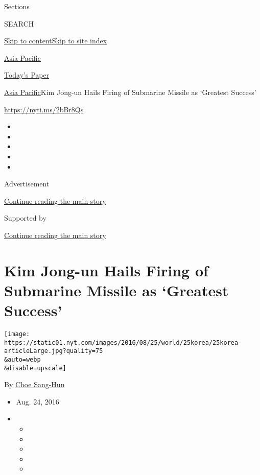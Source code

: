 Sections

SEARCH

\protect\hyperlink{site-content}{Skip to
content}\protect\hyperlink{site-index}{Skip to site index}

\href{https://www.nytimes.com/section/world/asia}{Asia Pacific}

\href{https://myaccount.nytimes.com/auth/login?response_type=cookie\&client_id=vi}{}

\href{https://www.nytimes.com/section/todayspaper}{Today's Paper}

\href{/section/world/asia}{Asia Pacific}\textbar{}Kim Jong-un Hails
Firing of Submarine Missile as `Greatest Success'

\url{https://nyti.ms/2bBr8Qs}

\begin{itemize}
\item
\item
\item
\item
\item
\end{itemize}

Advertisement

\protect\hyperlink{after-top}{Continue reading the main story}

Supported by

\protect\hyperlink{after-sponsor}{Continue reading the main story}

\hypertarget{kim-jong-un-hails-firing-of-submarine-missile-as-greatest-success}{%
\section{Kim Jong-un Hails Firing of Submarine Missile as `Greatest
Success'}\label{kim-jong-un-hails-firing-of-submarine-missile-as-greatest-success}}

\texttt{[image: https://static01.nyt.com/images/2016/08/25/world/25korea/25korea-articleLarge.jpg?quality=75\\\&auto=webp\\\&disable=upscale]}

By \href{http://www.nytimes.com/by/choe-sang-hun}{Choe Sang-Hun}

\begin{itemize}
\item
  Aug. 24, 2016
\item
  \begin{itemize}
  \item
  \item
  \item
  \item
  \item
  \end{itemize}
\end{itemize}

